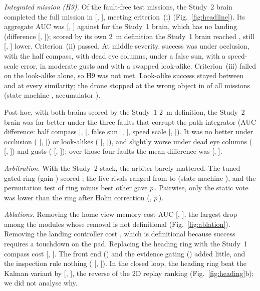 \documentclass[10pt,twocolumn]{article}
\begin{document}
\emph{Integrated mission (H9).} Of the \Nseeds{} fault-free test missions, the Study~2 brain completed the full mission in \StwoNoFault{} [\StwoNoFaultLo, \StwoNoFaultHi], meeting criterion~(i) (Fig.~\ref{fig:headline}). Its aggregate AUC was \StwoAUC{} [\StwoAUCLo, \StwoAUCHi] against \StwoAUCvone{} for the Study~1 brain, which has no landing (difference \StwoDiffVone{} [\StwoDiffVoneLo, \StwoDiffVoneHi]); scored by its own 2~m definition the Study~1 brain reached \StwoVoneOwn{}, still \StwoDiffOwn{} [\StwoDiffOwnLo, \StwoDiffOwnHi] lower. Criterion~(ii) passed. At middle severity, success was \StwoMidOcc{} under occlusion, \StwoMidCompass{} with the half compass, \StwoMidEye{} with dead eye columns, \StwoMidSun{} under a false sun, \StwoMidSpeed{} with a speed-scale error, \StwoMidGust{} in moderate gusts and \StwoMidDecoy{} with a swapped look-alike. Criterion~(iii) failed on the look-alike alone, so H9 was not met. Look-alike success stayed between \StwoDecoyLo{} and \StwoDecoyHi{} at every similarity; the drone stopped at the wrong object in \StwoWrongRing{} of all missions (state machine \StwoWrongSM, accumulator \StwoWrongAcc).

Post hoc, with both brains scored by the Study~1 2~m definition, the Study~2 brain was far better under the three faults that corrupt the path integrator (AUC difference: half compass \StwoOwnDiffCompass{} [\StwoOwnDiffCompassLo, \StwoOwnDiffCompassHi], false sun \StwoOwnDiffSun{} [\StwoOwnDiffSunLo, \StwoOwnDiffSunHi], speed scale \StwoOwnDiffSpeed{} [\StwoOwnDiffSpeedLo, \StwoOwnDiffSpeedHi]). It was no better under occlusion (\StwoOwnDiffOcc{} [\StwoOwnDiffOccLo, \StwoOwnDiffOccHi]) or look-alikes (\StwoOwnDiffDecoy{} [\StwoOwnDiffDecoyLo, \StwoOwnDiffDecoyHi]), and slightly worse under dead eye columns (\StwoOwnDiffEye{} [\StwoOwnDiffEyeLo, \StwoOwnDiffEyeHi]) and gusts (\StwoOwnDiffGust{} [\StwoOwnDiffGustLo, \StwoOwnDiffGustHi]); over those four faults the mean difference was \StwoOwnNonPI{} [\StwoOwnNonPILo, \StwoOwnNonPIHi].


\emph{Arbitration.} With the Study~2 stack, the arbiter barely mattered. The tuned gated ring (gain \StwoTunedGain) scored \StwoAUC; the five rivals ranged from \StwoRivalLo{} to \StwoRivalHi{} (state machine \StwoAUCsm), and the permutation test of ring minus best other gave $p$\,\StwoPermP. Pairwise, only the static vote was lower than the ring after Holm correction (\StwoVsVote, $p$\,\StwoVsVoteP).

\emph{Ablations.} Removing the home view memory cost \StwoAblHome{} AUC [\StwoAblHomeLo, \StwoAblHomeHi], the largest drop among the modules whose removal is not definitional (Fig.~\ref{fig:ablation}). Removing the landing controller cost \StwoAblLanding, which is definitional because success requires a touchdown on the pad. Replacing the heading ring with the Study~1 compass cost \StwoAblHeading{} [\StwoAblHeadingLo, \StwoAblHeadingHi]. The front end (\StwoAblFront) and the evidence gating (\StwoAblGated) added little, and the inspection rule nothing (\StwoAblInspect{} [\StwoAblInspectLo, \StwoAblInspectHi]). In the closed loop, the heading ring beat the Kalman variant by \StwoRingMinusKF{} [\StwoRingMinusKFLo, \StwoRingMinusKFHi], the reverse of the 2D replay ranking (Fig.~\ref{fig:heading}b); we did not analyse why.
\end{document}
